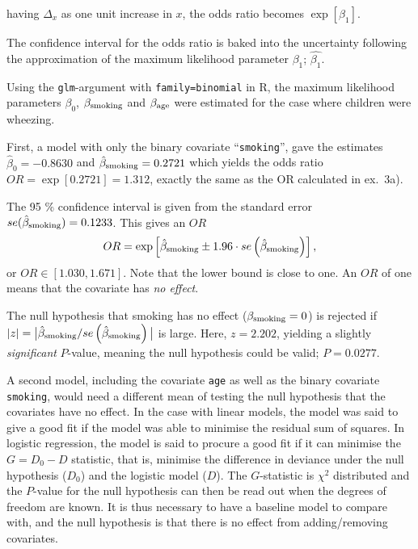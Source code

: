 \documentclass[a4paper,11pt]{article}
\begin{document}
\begin{enumerate}[label=\alph*)]
        having $\Delta_x$ as one unit increase in $x$, the odds ratio becomes $\exp[\beta_1]$. 

        The confidence interval for the odds ratio is baked into the uncertainty following the approximation of the maximum likelihood parameter $\beta_1$; $\hat{\beta_1}$. 

        Using the \texttt{glm}-argument with \texttt{family=binomial} in R, the maximum likelihood parameters $\beta_0$, $\beta_{\rm smoking}$ and $\beta_{\rm age}$ were estimated for the case where children were wheezing.

        First, a model with only the binary covariate ``\texttt{smoking}'', gave the estimates $\hat{\beta}_0 = -0.8630$ and $\hat{\beta}_{\rm smoking} = 0.2721$ which yields the odds ratio $OR = \exp[0.2721] = 1.312$, exactly the same as the OR calculated in ex.~3a). 
        
        The 95 \% confidence interval is given from the standard error $se(\hat{\beta}_{\rm smoking}) = 0.1233$. This gives an $OR$
        \begin{equation}
         OR = \exp \left[ \hat{\beta}_{\rm smoking} \pm 1.96 \cdot se\left( \hat{\beta}_{\rm smoking} \right) \right],
            \label{OR}
        \end{equation}
        or  $OR \in \left[1.030, 1.671  \right]$. Note that the lower bound is close to one. An $OR$ of one means that the covariate has \textit{no effect}. 
        
        The null hypothesis that smoking has no effect ($\beta_{\rm smoking} = 0$) is rejected if $|z| = \big| \hat{\beta}_{\rm smoking} / se\left( \hat{\beta}_{\rm smoking}  \right) \big|$ is large. Here, $z = 2.202$, yielding a slightly \textit{significant} $P$-value, meaning the null hypothesis could be valid; $P = 0.0277$. 

        A second model, including the covariate \texttt{age} as well as the binary covariate \texttt{smoking}, would need a different mean of testing the null hypothesis that the covariates have no effect. In the case with linear models, the model was said to give a good fit if the model was able to minimise the residual sum of squares. In logistic regression, the model is said to procure a good fit if it can minimise the $G = D_0 - D$ statistic, that is, minimise the difference in deviance under the null hypothesis ($D_0$) and the logistic model ($D$). The $G$-statistic is $\chi^2$ distributed and the $P$-value for the null hypothesis can then be read out when the degrees of freedom are known. It is thus necessary to have a baseline model to compare with, and the null hypothesis is that there is no effect from adding/removing covariates.


\end{enumerate}
\end{document}
